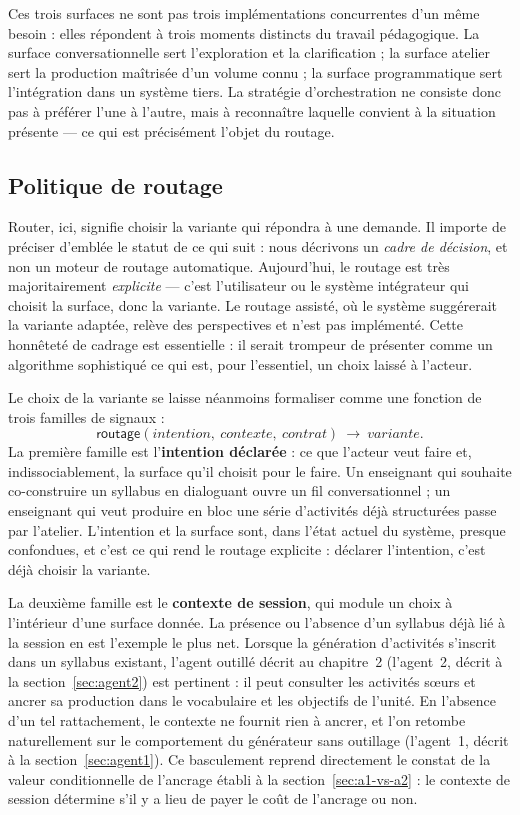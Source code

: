 Ces trois surfaces ne sont pas trois implémentations concurrentes d'un
même besoin : elles répondent à trois moments distincts du travail
pédagogique. La surface conversationnelle sert l'exploration et la
clarification ; la surface atelier sert la production maîtrisée d'un
volume connu ; la surface programmatique sert l'intégration dans un
système tiers. La stratégie d'orchestration ne consiste donc pas à
préférer l'une à l'autre, mais à reconnaître laquelle convient à la
situation présente — ce qui est précisément l'objet du routage.

\subsection{Politique de routage}
\label{sec:routage}

Router, ici, signifie choisir la variante qui répondra à une demande.
Il importe de préciser d'emblée le statut de ce qui suit : nous
décrivons un \emph{cadre de décision}, et non un moteur de routage
automatique. Aujourd'hui, le routage est très majoritairement
\emph{explicite} — c'est l'utilisateur ou le système intégrateur qui
choisit la surface, donc la variante. Le routage assisté, où le
système suggérerait la variante adaptée, relève des perspectives et
n'est pas implémenté. Cette honnêteté de cadrage est essentielle : il
serait trompeur de présenter comme un algorithme sophistiqué ce qui
est, pour l'essentiel, un choix laissé à l'acteur.

Le choix de la variante se laisse néanmoins formaliser comme une
fonction de trois familles de signaux :
\[
  \textsf{routage}(\textit{intention},\ \textit{contexte},\
  \textit{contrat})\ \longrightarrow\ \textit{variante}.
\]
La première famille est l'\textbf{intention déclarée} : ce que
l'acteur veut faire et, indissociablement, la surface qu'il choisit
pour le faire. Un enseignant qui souhaite co-construire un syllabus en
dialoguant ouvre un fil conversationnel ; un enseignant qui veut
produire en bloc une série d'activités déjà structurées passe par
l'atelier. L'intention et la surface sont, dans l'état actuel du
système, presque confondues, et c'est ce qui rend le routage
explicite : déclarer l'intention, c'est déjà choisir la variante.

La deuxième famille est le \textbf{contexte de session}, qui module
un choix à l'intérieur d'une surface donnée. La présence ou l'absence
d'un syllabus déjà lié à la session en est l'exemple le plus net.
Lorsque la génération d'activités s'inscrit dans un syllabus existant,
l'agent outillé décrit au chapitre~2 (l'agent~2, décrit à la
section~\ref{sec:agent2}) est pertinent : il peut consulter les
activités sœurs et ancrer sa production dans le vocabulaire et les
objectifs de l'unité. En l'absence d'un tel rattachement, le contexte
ne fournit rien à ancrer, et l'on retombe naturellement sur le
comportement du générateur sans outillage (l'agent~1, décrit à la
section~\ref{sec:agent1}). Ce basculement reprend directement le
constat de la valeur conditionnelle de l'ancrage établi à la
section~\ref{sec:a1-vs-a2} : le contexte de session détermine s'il y a
lieu de payer le coût de l'ancrage ou non.


